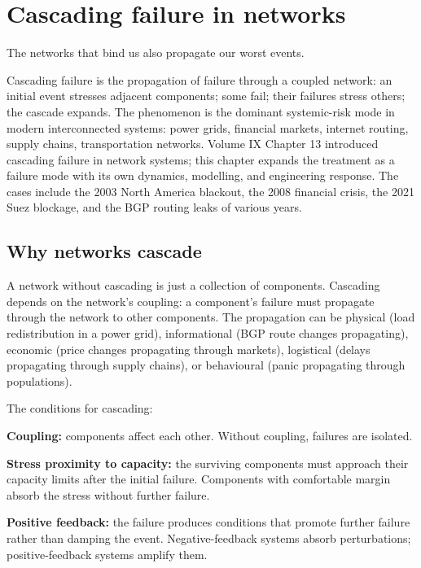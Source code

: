\chapter{Cascading failure in networks}
\label{vol10:ch07}

\epigraph{The networks that bind us also propagate our worst events.}{}


\noindent
Cascading failure is the propagation of failure through a coupled network: an initial event stresses adjacent components; some fail; their failures stress others; the cascade expands. The phenomenon is the dominant systemic-risk mode in modern interconnected systems: power grids, financial markets, internet routing, supply chains, transportation networks. Volume IX Chapter 13 introduced cascading failure in network systems; this chapter expands the treatment as a failure mode with its own dynamics, modelling, and engineering response. The cases include the 2003 North America blackout, the 2008 financial crisis, the 2021 Suez blockage, and the BGP routing leaks of various years.

\section{Why networks cascade}

A network without cascading is just a collection of components. Cascading depends on the network's coupling: a component's failure must propagate through the network to other components. The propagation can be physical (load redistribution in a power grid), informational (BGP route changes propagating), economic (price changes propagating through markets), logistical (delays propagating through supply chains), or behavioural (panic propagating through populations).

The conditions for cascading:

\textbf{Coupling:} components affect each other. Without coupling, failures are isolated.

\textbf{Stress proximity to capacity:} the surviving components must approach their capacity limits after the initial failure. Components with comfortable margin absorb the stress without further failure.

\textbf{Positive feedback:} the failure produces conditions that promote further failure rather than damping the event. Negative-feedback systems absorb perturbations; positive-feedback systems amplify them.

